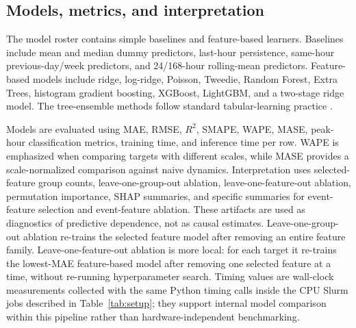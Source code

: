 \subsection{Models, metrics, and interpretation}

The model roster contains simple baselines and feature-based learners. Baselines
include mean and median dummy predictors, last-hour persistence, same-hour
previous-day/week predictors, and 24/168-hour rolling-mean predictors.
Feature-based models include ridge, log-ridge, Poisson, Tweedie, Random Forest,
Extra Trees, histogram gradient boosting, XGBoost, LightGBM, and a two-stage
ridge model. The tree-ensemble methods follow standard tabular-learning practice
\cite{Geurts2006ExtraTrees,Chen2016XGBoost,Ke2017LightGBM}.

Models are evaluated using MAE, RMSE, $R^2$, SMAPE, WAPE, MASE, peak-hour
classification metrics, training time, and inference time per row. WAPE is
emphasized when comparing targets with different scales, while MASE provides a
scale-normalized comparison against naive dynamics. Interpretation uses
selected-feature group counts, leave-one-group-out ablation,
leave-one-feature-out ablation, permutation importance, SHAP summaries, and
specific summaries for event-feature selection and event-feature ablation.
These artifacts are used as diagnostics of predictive dependence, not as causal
estimates. Leave-one-group-out ablation re-trains the selected feature model
after removing an entire feature family. Leave-one-feature-out ablation is more
local: for each target it re-trains the lowest-MAE feature-based model after
removing one selected feature at a time, without re-running hyperparameter
search.
Timing values are wall-clock
measurements collected with the same Python timing calls inside the CPU Slurm
jobs described in Table~\ref{tab:setup}; they support internal model comparison
within this pipeline rather than hardware-independent benchmarking.
